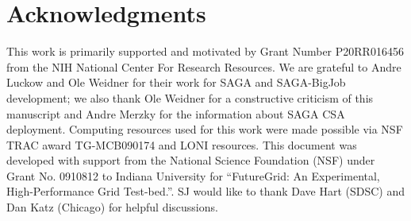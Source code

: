 \documentclass[]{svjour3}
\begin{document}
\section*{Acknowledgments}
This work is primarily supported and motivated by Grant Number
P20RR016456 from the NIH National Center For Research Resources. We
are grateful to Andre Luckow and Ole Weidner for their work for SAGA
and SAGA-BigJob development; we also thank Ole Weidner for a
constructive criticism of this manuscript and Andre Merzky for the information about SAGA CSA deployment. Computing resources used for this work were made possible via NSF TRAC award TG-MCB090174 and
LONI resources. This document was developed with support from the
National Science Foundation (NSF) under Grant No. 0910812 to Indiana
University for ``FutureGrid: An Experimental, High-Performance Grid
Test-bed.''. SJ would like to thank Dave Hart (SDSC) and Dan Katz
(Chicago) for helpful discussions.



%

%

\end{document}
